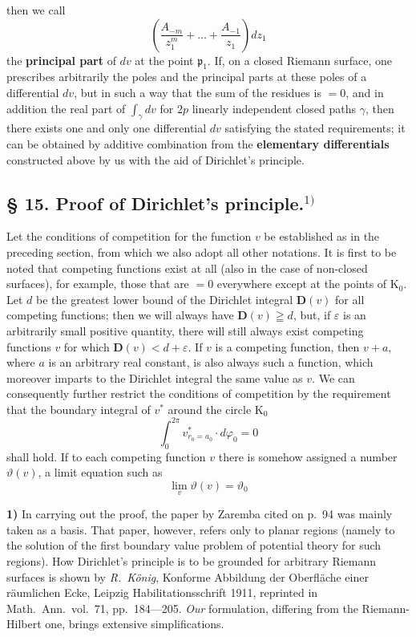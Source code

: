 \documentclass{article}
\begin{document}
then we call
\[ \left( \frac{A_{-m}}{z_1^m} + \dots + \frac{A_{-1}}{z_1} \right) dz_1 \]
the \textbf{principal part} of $dv$ at the point $\mathfrak{p}_1$. If, on a closed Riemann surface, one prescribes arbitrarily the poles and the principal parts at these poles of a differential $dv$, but in such a way that the sum of the residues is $= 0$, and in addition the real part of $\displaystyle\int_\gamma dv$ for $2p$ linearly independent closed paths $\gamma$, then there exists one and only one differential $dv$ satisfying the stated requirements; it can be obtained by additive combination from the \textbf{elementary differentials} constructed above by us with the aid of Dirichlet's principle.

\subsection*{§ 15. Proof of Dirichlet's principle.${}^{1)}$}

Let the conditions of competition for the function $v$ be established as in the preceding section, from which we also adopt all other notations. It is first to be noted that competing functions exist at all (also in the case of non-closed surfaces), for example, those that are $= 0$ everywhere except at the points of $\mathrm{K}_0$. Let $d$ be the greatest lower bound of the Dirichlet integral $\mathbf{D}(v)$ for all competing functions; then we will always have $\mathbf{D}(v) \geqq d$, but, if $\varepsilon$ is an arbitrarily small positive quantity, there will still always exist competing functions $v$ for which $\mathbf{D}(v) < d + \varepsilon$. If $v$ is a competing function, then $v + a$, where $a$ is an arbitrary real constant, is also always such a function, which moreover imparts to the Dirichlet integral the same value as $v$. We can consequently further restrict the conditions of competition by the requirement that the boundary integral of $v^*$ around the circle $\mathrm{K}_0$
\[ \int_0^{2\pi} v^*_{r_0 = a_0} \cdot d\varphi_0 = 0 \]
shall hold. If to each competing function $v$ there is somehow assigned a number $\vartheta(v)$, a limit equation such as
\[ \lim_v \vartheta(v) = \vartheta_0 \]

\textbf{1)} In carrying out the proof, the paper by Zaremba cited on p.~94 was mainly taken as a basis. That paper, however, refers only to planar regions (namely to the solution of the first boundary value problem of potential theory for such regions). How Dirichlet's principle is to be grounded for arbitrary Riemann surfaces is shown by \emph{R.~König}, Konforme Abbildung der Oberfläche einer räumlichen Ecke, Leipzig Habilitationsschrift 1911, reprinted in Math.\ Ann.\ vol.~71, pp.~184---205. \emph{Our} formulation, differing from the Riemann-Hilbert one, brings extensive simplifications.
\end{document}
